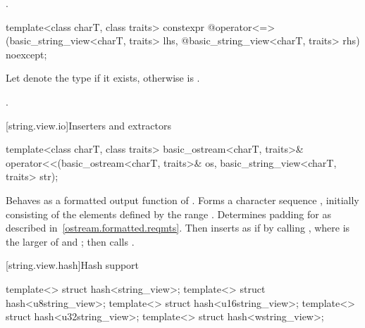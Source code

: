 \begin{itemdescr}
\pnum
\returns
{}.
\end{itemdescr}

%
\begin{itemdecl}
template<class charT, class traits>
  constexpr @\seebelow@ operator<=>(basic_string_view<charT, traits> lhs,
            @\itcorr@                      basic_string_view<charT, traits> rhs) noexcept;
\end{itemdecl}

\begin{itemdescr}
\pnum
Let  denote the type  if it exists,
otherwise  is .

\pnum
\returns
{}.
\end{itemdescr}

[string.view.io]{Inserters and extractors}

%
\begin{itemdecl}
template<class charT, class traits>
  basic_ostream<charT, traits>&
    operator<<(basic_ostream<charT, traits>& os, basic_string_view<charT, traits> str);
\end{itemdecl}

\begin{itemdescr}
\pnum
\effects
Behaves as a formatted output
function of . Forms a character sequence
, initially consisting of the elements defined by the range
. Determines padding for 
as described in~\ref{ostream.formatted.reqmts}.
Then inserts  as if by calling
, where  is the larger
of  and ;
then calls .

\pnum
\returns
{}
\end{itemdescr}

[string.view.hash]{Hash support}

%
%
%
%
%
\begin{itemdecl}
template<> struct hash<string_view>;
template<> struct hash<u8string_view>;
template<> struct hash<u16string_view>;
template<> struct hash<u32string_view>;
template<> struct hash<wstring_view>;
\end{itemdecl}

